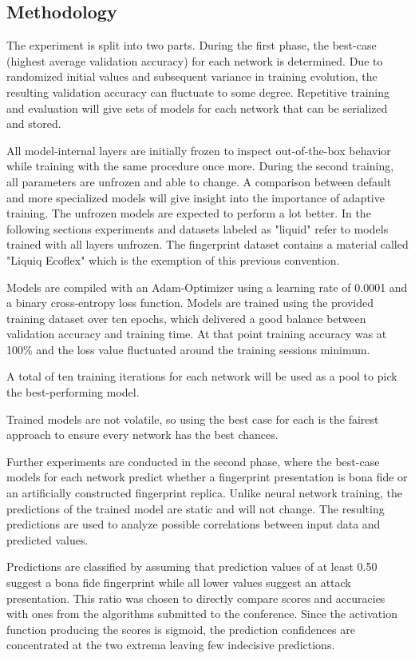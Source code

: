 


\subsection{Methodology}
The experiment is split into two parts.
During the first phase, the best-case (highest average validation accuracy) for each network is determined.
Due to randomized initial values and subsequent variance in training evolution, the resulting validation accuracy can fluctuate to some degree.
Repetitive training and evaluation will give sets of models for each network that can be serialized and stored.

All model-internal layers are initially frozen to inspect out-of-the-box behavior while training with the same procedure once more.
During the second training, all parameters are unfrozen and able to change.
A comparison between default and more specialized models will give insight into the importance of adaptive training.
The unfrozen models are expected to perform a lot better.
In the following sections experiments and datasets labeled as "liquid" refer to models trained with all layers unfrozen.
The fingerprint dataset contains a material called "Liquiq Ecoflex" which is the exemption of this previous convention.

Models are compiled with an Adam-Optimizer using a learning rate of 0.0001 and a binary cross-entropy loss function.
Models are trained using the provided training dataset over ten epochs, which delivered a good balance between validation accuracy and training time.
At that point training accuracy was at 100\% and the loss value fluctuated around the training sessions minimum.

A total of ten training iterations for each network will be used as a pool to pick the best-performing model.

Trained models are not volatile, so using the best case for each is the fairest approach to ensure every network has the best chances.

Further experiments are conducted in the second phase, where the best-case models for each network predict whether a fingerprint presentation is bona fide or an artificially constructed fingerprint replica.
Unlike neural network training, the predictions of the trained model are static and will not change.
The resulting predictions are used to analyze possible correlations between input data and predicted values.

Predictions are classified by assuming that prediction values of at least 0.50 suggest a bona fide fingerprint while all lower values suggest an attack presentation.
This ratio was chosen to directly compare scores and accuracies with ones from the algorithms submitted to the conference. \cite{LIVDET}
Since the activation function producing the scores is sigmoid, the prediction confidences are concentrated at the two extrema leaving few indecisive predictions.

